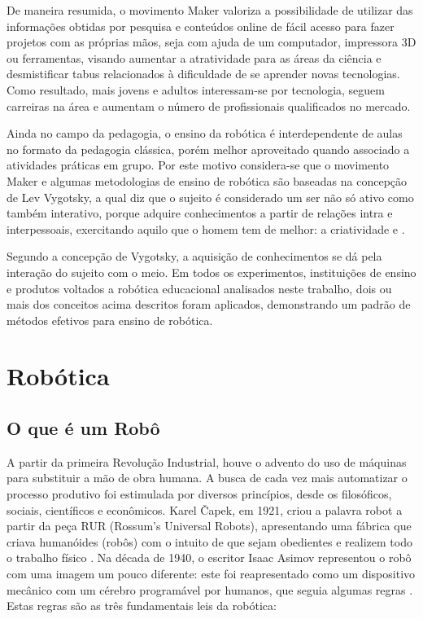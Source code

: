 De maneira resumida, o movimento Maker valoriza a possibilidade de utilizar das informações obtidas por pesquisa e conteúdos online de fácil acesso para fazer projetos com as próprias mãos, seja com ajuda de um computador, impressora 3D ou ferramentas, visando aumentar a atratividade para as áreas da ciência e desmistificar tabus relacionados à dificuldade de se aprender novas tecnologias. Como resultado, mais jovens e adultos interessam-se por tecnologia, seguem carreiras na área e aumentam o número de profissionais qualificados no mercado.

Ainda no campo da pedagogia, o ensino da robótica é interdependente de aulas no formato da pedagogia clássica, porém melhor aproveitado quando associado a atividades práticas em grupo. Por este motivo considera-se que o movimento Maker e algumas metodologias de ensino de robótica são baseadas na concepção de Lev Vygotsky, a qual diz que o sujeito é considerado um ser não só ativo como também interativo, porque adquire conhecimentos a partir de relações intra e interpessoais, exercitando aquilo que o homem tem de melhor: a criatividade \cite{Palangana} e \cite{rocha}.

Segundo a concepção de Vygotsky, a aquisição de conhecimentos se dá pela interação do sujeito com o meio. Em todos os experimentos, instituições de ensino e produtos voltados a robótica educacional  analisados neste trabalho, dois ou mais dos conceitos acima descritos foram aplicados, demonstrando um padrão de métodos efetivos para ensino de robótica.



\section{Robótica}\label{sec:oque_robo}
\subsection{O que é um Robô}
A partir da primeira Revolução Industrial, houve o advento do uso de máquinas para substituir a mão de obra humana. A busca de cada vez mais automatizar o processo produtivo foi estimulada por diversos princípios, desde os filosóficos, sociais, científicos e  econômicos. Karel Čapek, em 1921, criou a palavra robot a partir da peça RUR (Rossum's Universal Robots), apresentando uma fábrica que criava humanóides (robôs) com o intuito de que sejam obedientes e realizem todo o trabalho físico \cite{wellek}. Na década de 1940, o escritor Isaac Asimov representou o robô com uma imagem um pouco diferente: este foi reapresentado como um dispositivo mecânico com um cérebro programável por humanos, que seguia algumas regras \cite{asimov}. Estas regras são as três fundamentais leis da robótica:

